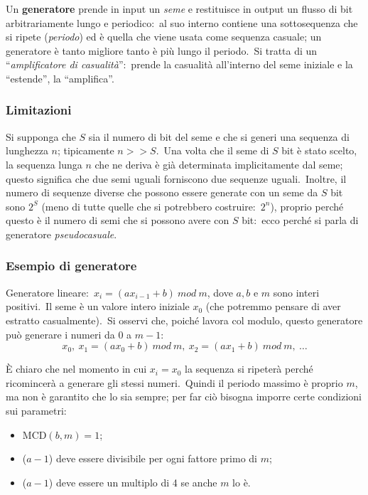 Un \textbf{generatore} prende in input un \textit{seme} e restituisce in output un flusso di bit arbitrariamente lungo e periodico:\ al suo interno contiene una sottosequenza che si ripete (\textit{periodo}) ed è quella che viene usata come sequenza casuale; un generatore è tanto migliore tanto è più lungo il periodo.\
Si tratta di un ``\textit{amplificatore di casualità}'':\ prende la casualità all'interno del seme iniziale e la ``estende'', la ``amplifica''.\

\subsubsection{Limitazioni}

Si supponga che $S$ sia il numero di bit del seme e che si generi una sequenza di lunghezza $n$; tipicamente $n>>S$.\
Una volta che il seme di $S$ bit è stato scelto, la sequenza lunga $n$ che ne deriva è già determinata implicitamente dal seme; questo significa che due semi uguali forniscono due sequenze uguali.\
Inoltre, il numero di sequenze diverse che possono essere generate con un seme da $S$ bit sono $2^S$ (meno di tutte quelle che si potrebbero costruire:\ $2^n$), proprio perché questo è il numero di semi che si possono avere con $S$ bit:\ ecco perché si parla di generatore \textit{pseudocasuale}.\

\subsubsection{Esempio di generatore}

Generatore lineare:\ $x_i = (ax_{i-1} + b)\ \mathit{mod}\ m$, dove $a, b$ e $m$ sono interi positivi.\
Il seme è un valore intero iniziale $x_0$ (che potremmo pensare di aver estratto casualmente).\
Si osservi che, poiché lavora col modulo, questo generatore può generare i numeri da 0 a $m - 1$:
\[x_0,\ x_1 = (ax_0 + b)\ \mathit{mod}\ m,\ x_2 = (ax_1 +b)\ \mathit{mod}\ m,\ \dots\]

\noindent È chiaro che nel momento in cui $x_i = x_0$ la sequenza si ripeterà perché ricomincerà a generare gli stessi numeri.\
Quindi il periodo massimo è proprio $m$, ma non è garantito che lo sia sempre; per far ciò bisogna imporre certe condizioni sui parametri:
\begin{itemize}
    \item $\mathrm{MCD}(b,m) = 1$;
    \item ($a-1$) deve essere divisibile per ogni fattore primo di $m$;
    \item ($a-1$) deve essere un multiplo di 4 se anche $m$ lo è.
\end{itemize}

